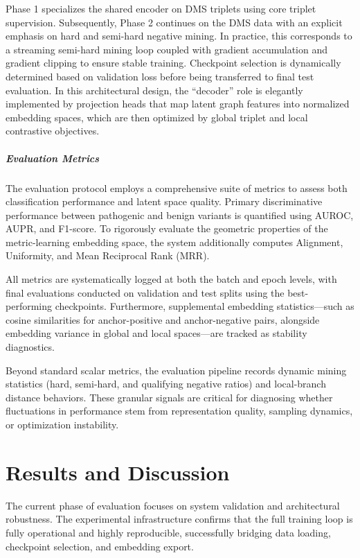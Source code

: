 \documentclass[unnumsec,webpdf,contemporary,large]{oup-authoring-template}%
\theoremstyle{thmstyleone}%
\theoremstyle{thmstyletwo}%
\theoremstyle{thmstylethree}%
\begin{document}
Phase 1 specializes the shared encoder on DMS triplets using core triplet supervision. Subsequently, Phase 2 continues on the DMS data with an explicit emphasis on hard and semi-hard negative mining. In practice, this corresponds to a streaming semi-hard mining loop coupled with gradient accumulation and gradient clipping to ensure stable training. Checkpoint selection is dynamically determined based on validation loss before being transferred to final test evaluation. In this architectural design, the ``decoder'' role is elegantly implemented by projection heads that map latent graph features into normalized embedding spaces, which are then optimized by global triplet and local contrastive objectives.


\subparagraph{Evaluation Metrics}
The evaluation protocol employs a comprehensive suite of metrics to assess both classification performance and latent space quality. Primary discriminative performance between pathogenic and benign variants is quantified using AUROC, AUPR, and F1-score. To rigorously evaluate the geometric properties of the metric-learning embedding space, the system additionally computes Alignment, Uniformity, and Mean Reciprocal Rank (MRR).

All metrics are systematically logged at both the batch and epoch levels, with final evaluations conducted on validation and test splits using the best-performing checkpoints. Furthermore, supplemental embedding statistics---such as cosine similarities for anchor-positive and anchor-negative pairs, alongside embedding variance in global and local spaces---are tracked as stability diagnostics.

Beyond standard scalar metrics, the evaluation pipeline records dynamic mining statistics (hard, semi-hard, and qualifying negative ratios) and local-branch distance behaviors. These granular signals are critical for diagnosing whether fluctuations in performance stem from representation quality, sampling dynamics, or optimization instability.

\section{Results and Discussion}\label{sec4}

The current phase of evaluation focuses on system validation and architectural robustness. The experimental infrastructure confirms that the full training loop is fully operational and highly reproducible, successfully bridging data loading, checkpoint selection, and embedding export. 
\end{document}
